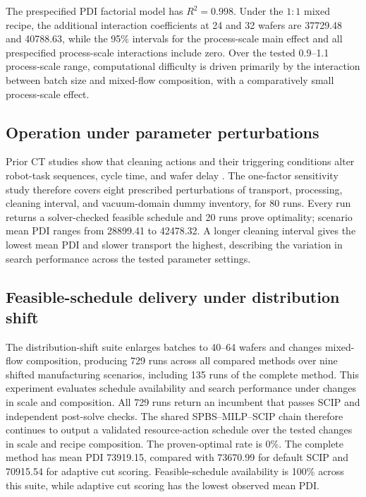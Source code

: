 \documentclass[journal]{IEEEtran}
\begin{document}
The prespecified PDI factorial model has $R^2=0.998$. Under the $1{:}1$ mixed recipe, the additional interaction coefficients at 24 and 32 wafers are 37729.48 and 40788.63, while the 95\% intervals for the process-scale main effect and all prespecified process-scale interactions include zero. Over the tested 0.9--1.1 process-scale range, computational difficulty is driven primarily by the interaction between batch size and mixed-flow composition, with a comparatively small process-scale effect.



\subsection{Operation under parameter perturbations}

Prior CT studies show that cleaning actions and their triggering conditions alter robot-task sequences, cycle time, and wafer delay \cite{yu2020delay,li2022conditioncleaning}. The one-factor sensitivity study therefore covers eight prescribed perturbations of transport, processing, cleaning interval, and vacuum-domain dummy inventory, for 80 runs. Every run returns a solver-checked feasible schedule and 20 runs prove optimality; scenario mean PDI ranges from 28899.41 to 42478.32. A longer cleaning interval gives the lowest mean PDI and slower transport the highest, describing the variation in search performance across the tested parameter settings.

\subsection{Feasible-schedule delivery under distribution shift}

The distribution-shift suite enlarges batches to 40--64 wafers and changes mixed-flow composition, producing 729 runs across all compared methods over nine shifted manufacturing scenarios, including 135 runs of the complete method. This experiment evaluates schedule availability and search performance under changes in scale and composition. All 729 runs return an incumbent that passes SCIP and independent post-solve checks. The shared SPBS--MILP--SCIP chain therefore continues to output a validated resource-action schedule over the tested changes in scale and recipe composition. The proven-optimal rate is 0\%. The complete method has mean PDI 73919.15, compared with 73670.99 for default SCIP and 70915.54 for adaptive cut scoring. Feasible-schedule availability is 100\% across this suite, while adaptive cut scoring has the lowest observed mean PDI.
\end{document}
